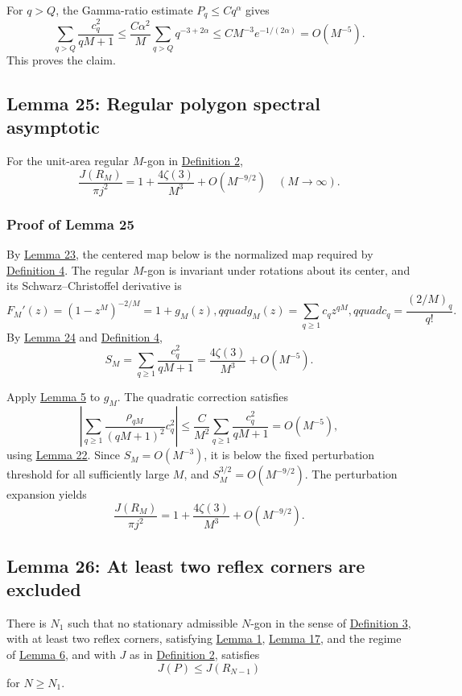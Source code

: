 \documentclass[11pt]{article}
\begin{document}
For \(q>Q\), the Gamma-ratio estimate \(P_q\le Cq^\alpha\) gives \[
\sum_{q>Q}\frac{c_q^2}{qM+1}
\le\frac{C\alpha^2}{M}\sum_{q>Q}q^{-3+2\alpha}
\le C M^{-3}e^{-1/(2\alpha)}=O(M^{-5}).
\] This proves the claim.

\subsection{Lemma 25: Regular polygon spectral
asymptotic}\label{lem-regular-polygon-asymptotic}

For the unit-area regular \(M\)-gon in
\hyperref[def-j-functional]{Definition 2}, \[
\frac{J(R_M)}{\pi j^2}=1+\frac{4\zeta(3)}{M^3}+O(M^{-9/2})
\quad (M\to\infty).
\]

\subsubsection{Proof of Lemma
25}\label{proof-lem-regular-polygon-asymptotic}

By \hyperref[lem-regular-center-maximizer]{Lemma 23}, the centered map
below is the normalized map required by
\hyperref[def-conformal-data]{Definition 4}. The regular \(M\)-gon is
invariant under rotations about its center, and its Schwarz--Christoffel
derivative is \[
F_M'(z)=(1-z^M)^{-2/M}=1+g_M(z),qquad
g_M(z)=\sum_{q\ge1}c_qz^{qM},qquad
c_q=\frac{(2/M)_q}{q!}.
\] By \hyperref[lem-regular-sc-coefficient-sum]{Lemma 24} and
\hyperref[def-conformal-data]{Definition 4}, \[
S_M=\sum_{q\ge1}\frac{c_q^2}{qM+1}
=\frac{4\zeta(3)}{M^3}+O(M^{-5}).
\]

Apply \hyperref[lem-disk-perturbation]{Lemma 5} to \(g_M\). The
quadratic correction satisfies \[
\left|\sum_{q\ge1}\frac{\rho_{qM}}{(qM+1)^2}c_q^2\right|
\le \frac{C}{M^2}\sum_{q\ge1}\frac{c_q^2}{qM+1}=O(M^{-5}),
\] using \hyperref[lem-bessel-ratio-decay]{Lemma 22}. Since
\(S_M=O(M^{-3})\), it is below the fixed perturbation threshold for all
sufficiently large \(M\), and \(S_M^{3/2}=O(M^{-9/2})\). The
perturbation expansion yields \[
\frac{J(R_M)}{\pi j^2}=1+\frac{4\zeta(3)}{M^3}+O(M^{-9/2}).
\]

\subsection{Lemma 26: At least two reflex corners are
excluded}\label{lem-two-reflex-exclusion}

There is \(N_1\) such that no stationary admissible \(N\)-gon in the
sense of \hyperref[def-stationary-polygon]{Definition 3}, with at least
two reflex corners, satisfying \hyperref[lem-edge-moments]{Lemma 1},
\hyperref[lem-spectral-core]{Lemma 17}, and the regime of
\hyperref[lem-near-circle-conformal]{Lemma 6}, and with \(J\) as in
\hyperref[def-j-functional]{Definition 2}, satisfies \[
J(P)\le J(R_{N-1})
\] for \(N\ge N_1\).
\end{document}
